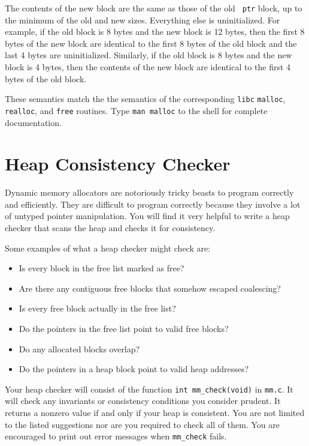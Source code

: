 \documentclass[11pt]{article}
\begin{document}
\begin{itemize}
\begin{itemize}
The contents of the new block are the same as those of the old {\tt
ptr} block, up to the minimum of the old and new sizes. Everything
else is uninitialized. For example, if the old block is 8 bytes and
the new block is 12 bytes, then the first 8 bytes of the new block
are identical to the first 8 bytes of the old block and the last 4
bytes are uninitialized.  Similarly, if the old block is 8 bytes and
the new block is 4 bytes, then the contents of the new block are
identical to the first 4 bytes of the old block.
\end{itemize}
\end{itemize}

These semantics match the the semantics of the corresponding
{\tt libc} {\tt malloc}, {\tt realloc}, and {\tt free} routines.
Type {\tt man malloc} to the shell for complete documentation.

\section{Heap Consistency Checker}  

Dynamic memory allocators are notoriously tricky beasts to program
correctly and efficiently. They are difficult to program correctly
because they involve a lot of untyped pointer manipulation.  You will
find it very helpful to write a heap checker that scans the heap and
checks it for consistency.

Some examples of what a heap checker might check are:
\begin{itemize}
\item Is every block in the free list marked as free?
\item Are there any contiguous free blocks that somehow escaped
coalescing?
\item Is every free block actually in the free list?
\item Do the pointers in the free list point to valid free blocks?
\item Do any allocated blocks overlap?
\item Do the pointers in a heap block point to valid heap
addresses?
\end{itemize}

Your heap checker will consist of the function {\tt int
mm\_check(void)} in {\tt mm.c}.  It will check any invariants or
consistency conditions you consider prudent.  It returns a nonzero
value if and only if your heap is consistent.  You are not limited to
the listed suggestions nor are you required to check all of them.  You
are encouraged to print out error messages when {\tt mm\_check} fails.
\end{document}
